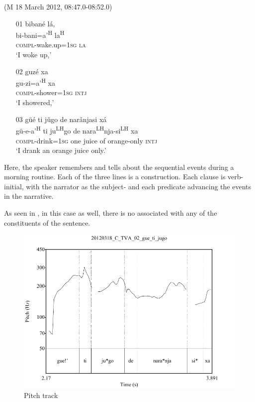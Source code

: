 \ea\label{guetijugo} (M 18 March 2012, 08:47.0-08:52.0)
\begin{itemize}
\item [01]
\glll biban\'{e} l\'{a}, \\
bi-bani=a'\textsuperscript{H} la\textsuperscript{H} \\
\textsc{compl}-wake.up=\textsc{1sg} \textsc{la} \\
\glt `I woke up,' 


\item [02]
\glll guz\'{e} xa \\
gu-zi=a'\textsuperscript{H} xa \\
\textsc{compl}-shower=\textsc{1sg} \textsc{intj} \\
\glt `I showered,' 


\item [03]
\glll g\"{u}\'{e} ti j\v{u}go de nar\v{a}njasi x\'{a} \\
g\"{u}-e-a'\textsuperscript{H} ti ju\textsuperscript{LH}go de nara\textsuperscript{LH}nja-si\textsuperscript{LH} xa \\
\textsc{compl}-drink=\textsc{1sg} one juice of orange-only \textsc{intj} \\
\glt `I drank an orange juice only.'

\end{itemize}
\z
Here, the speaker remembers and tells about the sequential events during a morning routine. Each of the three lines is a  construction. Each clause is verb-initial, with the narrator as the subject- and each predicate advancing the events in the narrative. 

As seen in , in this case as well, there is no  associated with any of the constituents of the sentence. 

\begin{figure} 
\caption{Pitch track}
\label{fig:5:guetijugo}
\includegraphics[height=.4\textheight]{guetijugo}
\end{figure}


